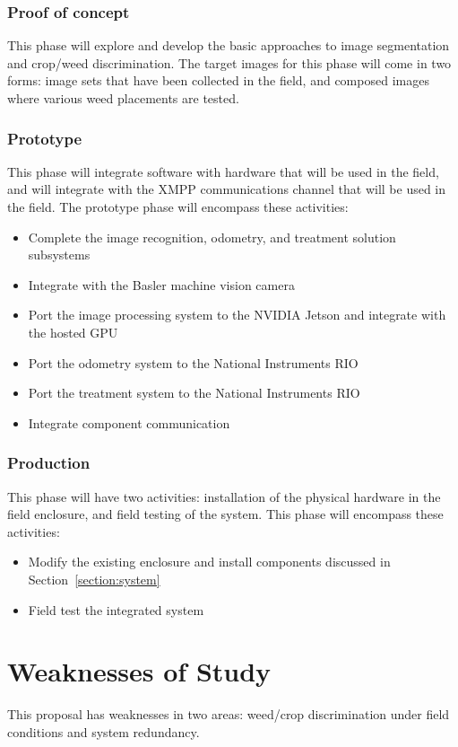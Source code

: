 \documentclass[letterpaper]{article}
\begin{document}
{{\subsubsection{Proof of concept}
This phase will explore and develop the basic approaches to image segmentation and crop/weed discrimination. The target images for this phase will come in two forms: image sets that have been collected in the field, and composed images where various weed placements are tested.
\subsubsection{Prototype}
This phase will integrate software with hardware that will be used in the field, and will integrate with the XMPP communications channel that will be used in the field. The prototype phase will encompass these activities: \\
\begin{itemize}
	\item{Complete the image recognition, odometry, and treatment solution subsystems}
	\item{Integrate with the Basler machine vision camera}
	\item{Port the image processing system to the NVIDIA Jetson and integrate with the hosted GPU}
	\item{Port the odometry system to the National Instruments RIO}
	\item{Port the treatment system to the National Instruments RIO}
	\item{Integrate component communication}
\end{itemize}
\subsubsection{Production}
This phase will have two activities: installation of the physical hardware in the field enclosure, and field testing of the system. This phase will encompass these activities:
\begin{itemize}
	\item{Modify the existing enclosure and install components discussed in Section~\ref{section:system}}
	\item{Field test the integrated system}
\end{itemize}

 \newpage
%
%
\section{Weaknesses of Study}
This proposal has weaknesses in two areas: weed/crop discrimination under field conditions and system redundancy.

}}
\end{document}
